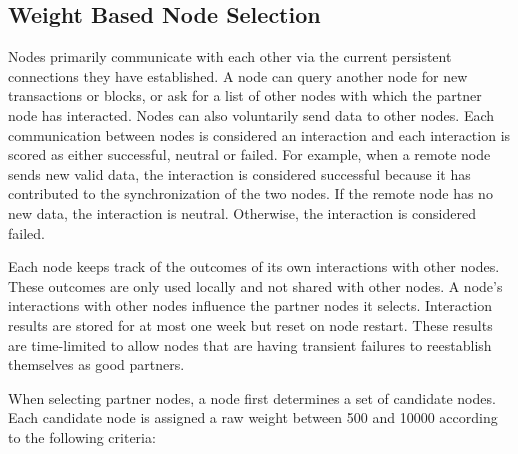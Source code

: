 \subsection{Weight Based Node Selection}
\label{sec:reputation:NodeSelection}

Nodes primarily communicate with each other via the current persistent connections they have established.
A node can query another node for new transactions or blocks, or ask for a list of other nodes with which the partner node has interacted.
Nodes can also voluntarily send data to other nodes.
Each communication between nodes is considered an interaction and each interaction is scored as either successful, neutral or failed.
For example, when a remote node sends new valid data, the interaction is considered successful because it has contributed to the synchronization of the two nodes.
If the remote node has no new data, the interaction is neutral.
Otherwise, the interaction is considered failed.

Each node keeps track of the outcomes of its own interactions with other nodes.
These outcomes are only used locally and not shared with other nodes.
A node's interactions with other nodes influence the partner nodes it selects.
Interaction results are stored for at most one week but reset on node restart.
These results are time-limited to allow nodes that are having transient failures to reestablish themselves as good partners.

When selecting partner nodes, a node first determines a set of candidate nodes.
Each candidate node is assigned a raw weight between 500 and 10000 according to the following criteria:

